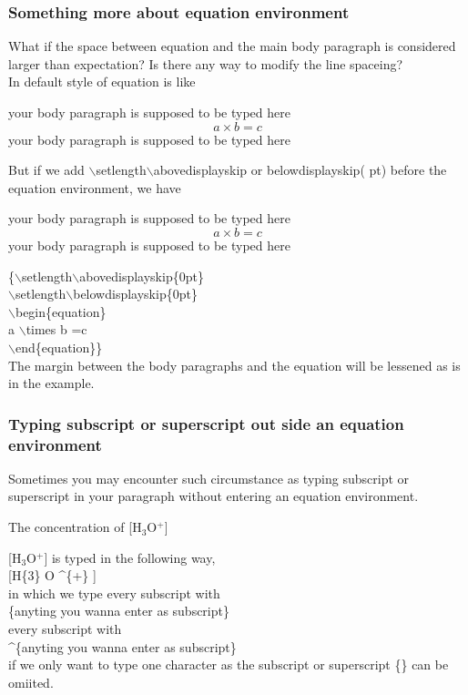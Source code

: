 \documentclass{beamer}
\begin{document}
\begin{frame}
	\frametitle{Something more about equation environment}
    What if the space between equation and the main body paragraph is considered larger than expectation? Is there any way to modify the line spaceing?
\\In default style of equation is like
    \begin{example}
    your body paragraph is supposed to be typed here
        \begin{equation}
         a \times b =c
        \end{equation}
    your body paragraph is supposed to be typed here
	\end{example}
\end{frame}
\begin{frame}
But if we add 
{\color{red} $\backslash$setlength$\backslash$abovedisplayskip or belowdisplayskip( pt)} before the equation environment, we have
    \begin{example}
    your body paragraph is supposed to be typed here
		{\setlength\abovedisplayskip{0pt}
        \setlength\belowdisplayskip{0pt}
        \begin{equation}
         a \times b =c
        \end{equation}}
    your body paragraph is supposed to be typed here
	\end{example}
    {\color{blue}\{$\backslash$setlength$\backslash$abovedisplayskip\{0pt\}
        \\$\backslash$setlength$\backslash$belowdisplayskip\{0pt\}
       \\ $\backslash$begin\{equation\}
         \\a $\backslash$times b =c
        \\$\backslash$end\{equation\}\}}
    \\The margin between the body paragraphs and the equation will be lessened 
    as is in the example.
\end{frame}
\begin{frame}
	\frametitle{Typing subscript or superscript out side an equation environment}
    Sometimes you may encounter such circumstance as typing subscript or superscript in your paragraph without entering an equation environment.
    \begin{example}
       The concentration of [H$_3$O$^+$]
    \end{example}
    [H$_3$O$^+$] is typed in the following way,
    \\{\color{blue} [H\textdollar \textunderscore\{3\} \textdollar O \textdollar \textasciicircum \{+\} \textdollar] }
    \\ in which we type every subscript with 
    \\{\color{red} \textdollar \textunderscore\{anyting you wanna enter as subscript\}\textdollar}
    \\every subscript with 
    \\{\color{red} \textdollar \textasciicircum\{anyting you wanna enter as subscript\}\textdollar}
    \\ if we only want to type one character as the subscript or superscript \{\} can be omiited.
\end{frame}
\end{document}
